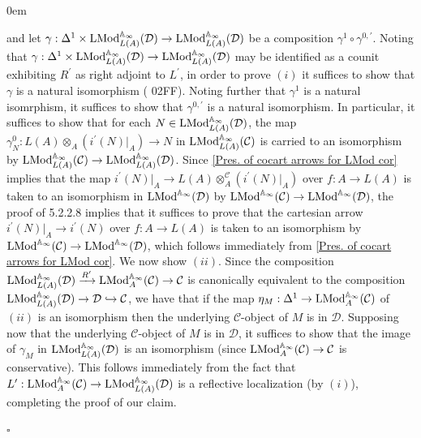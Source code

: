 \documentclass[10pt]{article}
\newcommand{\C}{\mathcal C}
\newcommand{\cD}{\mathcal{D}}
\def\AA{{\mathbb A}}
\renewcommand{\qed}{\hfill$\square$}
\renewenvironment{proof}{\begin{addmargin}[1em]{0em}\begin{newproof}}{\end{newproof}\end{addmargin}\qed}
\theoremstyle{witharg}
\theoremstyle{witharg}
\theoremstyle{witharg2}
\begin{document}
\begin{proof}
\noindent and let $\gamma:\Delta^1\times \textnormal{LMod}^{\AA_\infty}_{L(A)}(\cD)\rightarrow \textnormal{LMod}^{\AA_\infty}_{L(A)}(\cD)$ be a composition $\gamma^1\circ \gamma^{0,\prime}$. Noting that $\gamma:\Delta^1\times \textnormal{LMod}^{\AA_\infty}_{L(A)}(\cD)\rightarrow \textnormal{LMod}^{\AA_\infty}_{L(A)}(\cD)$ may be identified as a counit exhibiting $R^\prime$ as right adjoint to $L^\prime$, in order to prove $(i)$ it suffices to show that $\gamma$ is a natural isomorphism ( 02FF). Noting further that $\gamma^1$ is a natural isomrphism, it suffices to show that $\gamma^{0,\prime}$ is a natural isomorphism. In particular, it suffices to show that for each $N\in \textnormal{LMod}^{\AA_\infty}_{L(A)}(\cD)$, the map $\gamma^0_N:L(A)\otimes_A(i^\prime(N)|_A)\rightarrow N$ in $\textnormal{LMod}^{\AA_\infty}_{L(A)}(\C)$ is carried to an isomorphism by $\textnormal{LMod}^{\AA_\infty}_{L(A)}(\C)\rightarrow \textnormal{LMod}^{\AA_\infty}_{L(A)}(\cD)$. Since \ref{Pres. of cocart arrows for LMod cor} implies that the map $i^\prime(N)|_A\rightarrow L(A)\otimes^\C_A(i^\prime(N)|_A)$ over $f:A\rightarrow L(A)$ is taken to an isomorphism in $\textnormal{LMod}^{\AA_\infty}(\cD)$ by $\textnormal{LMod}^{\AA_\infty}(\C)\rightarrow \textnormal{LMod}^{\AA_\infty}(\cD)$, the proof of  5.2.2.8 implies that it suffices to prove that the cartesian arrow $i^\prime(N)|_A\rightarrow i^\prime(N)$ over $f:A\rightarrow L(A)$ is taken to an isomorphism by $\textnormal{LMod}^{\AA_\infty}(\C)\rightarrow \textnormal{LMod}^{\AA_\infty}(\cD)$, which follows immediately from \ref{Pres. of cocart arrows for LMod cor}. We now show $(ii)$. Since the composition $\textnormal{LMod}^{\AA_\infty}_{L(A)}(\cD)\xrightarrow{R^\prime}\textnormal{LMod}^{\AA_\infty}_{A}(\C)\rightarrow \C$ is canonically equivalent to the composition $\textnormal{LMod}^{\AA_\infty}_{L(A)}(\cD)\rightarrow \cD\hookrightarrow \C$, we have that if the map $\eta_M:\Delta^1\rightarrow \textnormal{LMod}^{\AA_\infty}_{A}(\C)$ of $(ii)$ is an isomorphism then the underlying $\C$-object of $M$ is in $\cD$. Supposing now that the underlying $\C$-object of $M$ is in $\cD$, it suffices to show that the image of $\gamma_M$ in $\textnormal{LMod}^{\AA_\infty}_{L(A)}(\cD)$ is an isomorphism (since $\textnormal{LMod}^{\AA_\infty}_{A}(\C)\rightarrow \C$ is conservative). This follows immediately from the fact that $L^\prime:\textnormal{LMod}^{\AA_\infty}_{A}(\C)\rightarrow \textnormal{LMod}^{\AA_\infty}_{L(A)}(\cD)$ is a reflective localization (by $(i)$), completing the proof of our claim. 


\end{proof}
\end{document}
